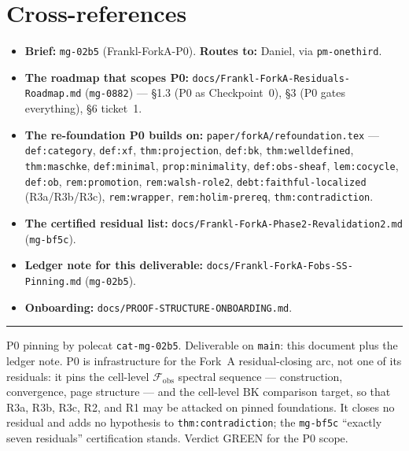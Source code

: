 \documentclass[11pt,oneside]{amsart}
\theoremstyle{plain}
\theoremstyle{definition}
\theoremstyle{remark}
\theoremstyle{honeststyle}
\newcommand{\BK}{\mathrm{BK}}
\newcommand{\fobs}{\mathcal{F}_{\mathrm{obs}}}
\begin{document}
\section*{Cross-references}

\begin{itemize}[leftmargin=1.6em]
\item \textbf{Brief:} \texttt{mg-02b5} (Frankl-ForkA-P0). \textbf{Routes
  to:} Daniel, via \texttt{pm-onethird}.
\item \textbf{The roadmap that scopes P0:}
  \texttt{docs/Frankl-ForkA-Residuals-Roadmap.md} (\texttt{mg-0882})
  --- \S1.3 (P0 as Checkpoint~0), \S3 (P0 gates everything), \S6
  ticket~1.
\item \textbf{The re-foundation P0 builds on:}
  \texttt{paper/forkA/refoundation.tex} --- \texttt{def:category},
  \texttt{def:xf}, \texttt{thm:projection}, \texttt{def:bk},
  \texttt{thm:welldefined}, \texttt{thm:maschke},
  \texttt{def:minimal}, \texttt{prop:minimality},
  \texttt{def:obs-sheaf}, \texttt{lem:cocycle}, \texttt{def:ob},
  \texttt{rem:promotion}, \texttt{rem:walsh-role2},
  \texttt{debt:faithful-localized} (R3a/R3b/R3c), \texttt{rem:wrapper},
  \texttt{rem:holim-prereq}, \texttt{thm:contradiction}.
\item \textbf{The certified residual list:}
  \texttt{docs/Frankl-ForkA-Phase2-Revalidation2.md} (\texttt{mg-bf5c}).
\item \textbf{Ledger note for this deliverable:}
  \texttt{docs/Frankl-ForkA-Fobs-SS-Pinning.md} (\texttt{mg-02b5}).
\item \textbf{Onboarding:} \texttt{docs/PROOF-STRUCTURE-ONBOARDING.md}.
\end{itemize}

\bigskip
\noindent\rule{\textwidth}{0.4pt}

\smallskip
\noindent\footnotesize P0 pinning by polecat \texttt{cat-mg-02b5}.
Deliverable on \texttt{main}: this document plus the ledger note. P0
is infrastructure for the Fork~A residual-closing arc, not one of its
residuals: it pins the cell-level $\fobs$ spectral sequence ---
construction, convergence, page structure --- and the cell-level
$\BK$ comparison target, so that R3a, R3b, R3c, R2, and R1 may be
attacked on pinned foundations. It closes no residual and adds no
hypothesis to \texttt{thm:contradiction}; the \texttt{mg-bf5c}
``exactly seven residuals'' certification stands. Verdict GREEN for
the P0 scope.
\end{document}
